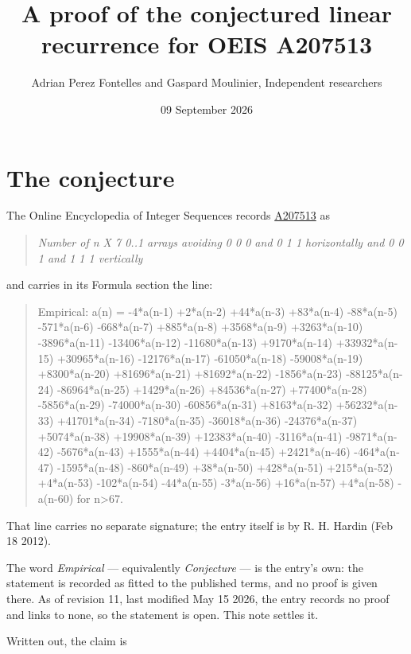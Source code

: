 \documentclass[11pt]{article}
\title{A proof of the conjectured linear recurrence for OEIS A207513}
\author{Adrian Perez Fontelles and Gaspard Moulinier, Independent researchers}
\date{09 September 2026}
\theoremstyle{definition}
\begin{document}
\maketitle
\section{The conjecture}

The Online Encyclopedia of Integer Sequences records \href{https://oeis.org/A207513}{A207513} as

\begin{quote}\itshape Number of n X 7 0..1 arrays avoiding 0 0 0 and 0 1 1 horizontally and 0 0 1 and 1 1 1 vertically\end{quote}

and carries in its Formula section the line:

\begin{quote}\ttfamily Empirical: a(n) = -4*a(n-1) +2*a(n-2) +44*a(n-3) +83*a(n-4) -88*a(n-5) -571*a(n-6) -668*a(n-7) +885*a(n-8) +3568*a(n-9) +3263*a(n-10) -3896*a(n-11) -13406*a(n-12) -11680*a(n-13) +9170*a(n-14) +33932*a(n-15) +30965*a(n-16) -12176*a(n-17) -61050*a(n-18) -59008*a(n-19) +8300*a(n-20) +81696*a(n-21) +81692*a(n-22) -1856*a(n-23) -88125*a(n-24) -86964*a(n-25) +1429*a(n-26) +84536*a(n-27) +77400*a(n-28) -5856*a(n-29) -74000*a(n-30) -60856*a(n-31) +8163*a(n-32) +56232*a(n-33) +41701*a(n-34) -7180*a(n-35) -36018*a(n-36) -24376*a(n-37) +5074*a(n-38) +19908*a(n-39) +12383*a(n-40) -3116*a(n-41) -9871*a(n-42) -5676*a(n-43) +1555*a(n-44) +4404*a(n-45) +2421*a(n-46) -464*a(n-47) -1595*a(n-48) -860*a(n-49) +38*a(n-50) +428*a(n-51) +215*a(n-52) +4*a(n-53) -102*a(n-54) -44*a(n-55) -3*a(n-56) +16*a(n-57) +4*a(n-58) -a(n-60) for n>67.\end{quote}

That line carries no separate signature; the entry itself is by R. H. Hardin (Feb 18 2012).

The word {\itshape Empirical} --- equivalently {\itshape Conjecture} --- is the entry's own: the statement is recorded as fitted to the published terms, and no proof is given there. As of revision 11, last modified May 15 2026, the entry records no proof and links to none, so the statement is open. This note settles it.

Written out, the claim is
\end{document}
